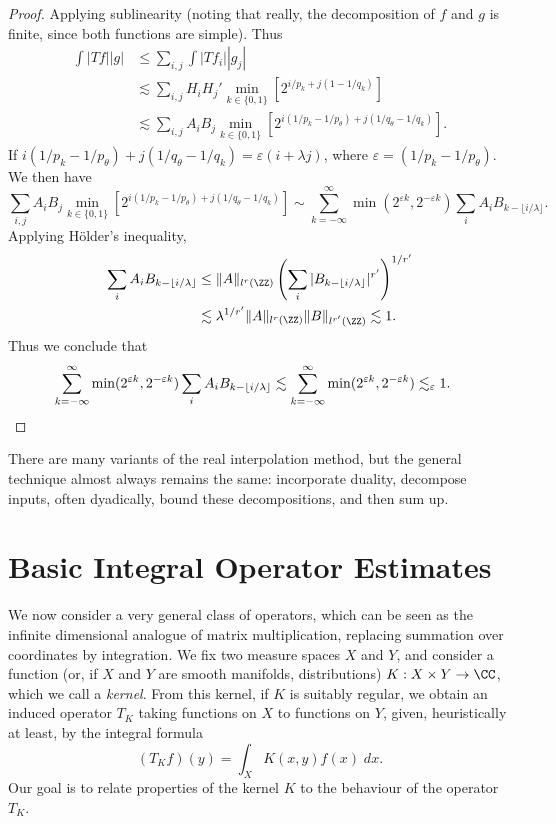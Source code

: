 \begin{proof}
  Applying sublinearity (noting that really, the decomposition of $f$ and $g$ is finite, since both functions are simple). Thus
  \begin{align*}
    \int |Tf| |g| &\leq \sum_{i,j} \int |Tf_i| |g_j|\\
    &\lesssim \sum_{i,j} H_i H_j' \min_{k \in \{0,1\}} \left[ 2^{i/p_k + j(1 - 1/q_k)} \right]\\
    &\lesssim \sum_{i,j} A_i B_j \min_{k \in \{ 0, 1 \}} \left[ 2^{i(1/p_k - 1/p_\theta) + j(1/q_\theta - 1/q_k)} \right].
  \end{align*}
  If $i(1/p_k - 1/p_\theta) + j(1/q_\theta - 1/q_k) = \varepsilon(i + \lambda j)$, where $\varepsilon = (1/p_k - 1/p_\theta)$. We then have
  \[ \sum_{i,j} A_i B_j \min_{k \in \{ 0, 1 \}} \left[ 2^{i(1/p_k - 1/p_\theta) + j(1/q_\theta - 1/q_k)} \right] \sim \sum_{k = -\infty}^\infty \min(2^{\varepsilon k}, 2^{-\varepsilon k}) \sum_i A_i B_{k - \lfloor i/\lambda \rfloor}. \]
  Applying H\"{o}lder's inequality,
  \begin{align*}
    \sum_i A_i B_{k - \lfloor i/\lambda \rfloor} &\leq \| A \|_{l^r(\ZZ)} \left( \sum_i |B_{k - \lfloor i/\lambda \rfloor}|^{r'} \right)^{1/r'}\\
    &\lesssim \lambda^{1/r'} \| A \|_{l^r(\ZZ)} \| B \|_{l^{r'}(\ZZ)} \lesssim 1.
  \end{align*}
  Thus we conclude that
  \begin{align*}
    \sum_{k = -\infty}^\infty \min(2^{\varepsilon k}, 2^{-\varepsilon k}) \sum_i A_i B_{k - \lfloor i/\lambda \rfloor} &\lesssim \sum_{k = -\infty}^\infty \min(2^{\varepsilon k}, 2^{-\varepsilon k}) \lesssim_\varepsilon 1. \qedhere
  \end{align*}
\end{proof}

There are many variants of the real interpolation method, but the general technique almost always remains the same: incorporate duality, decompose inputs, often dyadically, bound these decompositions, and then sum up.










\chapter{Basic Integral Operator Estimates}

We now consider a very general class of operators, which can be seen as the infinite dimensional analogue of matrix multiplication, replacing summation over coordinates by integration. We fix two measure spaces $X$ and $Y$, and consider a function (or, if $X$ and $Y$ are smooth manifolds, distributions) $K: X \times Y \to \CC$, which we call a \emph{kernel}. From this kernel, if $K$ is suitably regular, we obtain an induced operator $T_K$ taking functions on $X$ to functions on $Y$, given, heuristically at least, by the integral formula
%
\[ (T_K f)(y) = \int_X K(x,y) f(x)\; dx. \]
%
Our goal is to relate properties of the kernel $K$ to the behaviour of the operator $T_K$.

